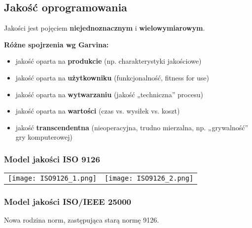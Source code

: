\documentclass[../main.tex]{subfiles}
\begin{document}
    \subsection{Jakość oprogramowania}
    Jakości jest pojęciem \textbf{niejednoznacznym} i \textbf{wielowymiarowym}.

    \textbf{Różne spojrzenia wg Garvina:}
    \begin{itemize}
        \item jakość oparta na \textbf{produkcie} (np. charakterystyki jakościowe)
        \item jakość oparta na \textbf{użytkowniku} (funkcjonalność, fitness for use)
        \item jakość oparta na \textbf{wytwarzaniu} (jakość „techniczna” procesu)
        \item jakość oparta na \textbf{wartości} (czas vs. wysiłek vs. koszt)
        \item jakość \textbf{transcendentna} (nieoperacyjna, trudno mierzalna, np. „grywalność” gry komputerowej)
    \end{itemize}


    \subsubsection{Model jakości ISO 9126}

    \begin{table}[H]
        \begin{center}
            \begin{tabular}{ p{8cm} p{8cm}}
                \texttt{[image: ISO9126\_1.png]}
                &
                \texttt{[image: ISO9126\_2.png]}
            \end{tabular}
        \end{center}
    \end{table}


    \subsubsection{Model jakości ISO/IEEE 25000}
    Nowa rodzina norm, zastępująca starą normę 9126.
\end{document}
